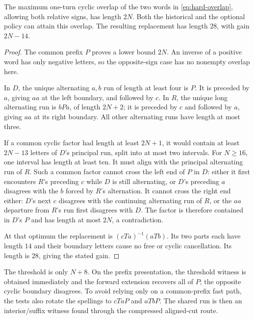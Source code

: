 \begin{proposition}
The maximum one-turn cyclic overlap of the two words in
\eqref{eq:hard-overlap}, allowing both relative signs, has length $2N$.
Both the historical and the optional policy can attain this overlap. The
resulting replacement has length $28$, with gain $2N-14$.
\label{prop:stress-overlap}
\end{proposition}
\begin{proof}
The common prefix $P$ proves a lower bound $2N$. An inverse of a positive
word has only negative letters, so the opposite-sign case has no nonempty
overlap here.

In $D$, the unique alternating $a,b$ run of length at least four is $P$.
It is preceded by $a$, giving $aa$ at the left boundary, and followed by
$c$. In $R$, the unique long alternating run is $bPa$, of length $2N+2$;
it is preceded by $c$ and followed by $a$, giving $aa$ at its right boundary.
All other alternating runs have length at most three.

If a common cyclic factor had length at least $2N+1$, it would contain at
least $2N-13$ letters of $D$'s principal run, split into at most two intervals.
For $N\geq16$, one interval has length at least ten. It must align with the
principal alternating run of $R$. Such a common factor cannot cross the
left end of $P$ in $D$: either it first encounters $R$'s preceding $c$ while
$D$ is still alternating, or $D$'s preceding $a$ disagrees with the $b$
forced by $R$'s alternation. It cannot cross the right end either: $D$'s
next $c$ disagrees with the continuing alternating run of $R$, or the $aa$
departure from $R$'s run first disagrees with $D$. The factor is therefore
contained in $D$'s $P$ and has length at most $2N$, a contradiction.

At that optimum the replacement is $(cTa)^{-1}(aTb)$. Its two parts each
have length $14$ and their boundary letters cause no free or cyclic
cancellation. Its length is $28$, giving the stated gain.
\end{proof}

The threshold is only $N+8$. On the prefix presentation, the threshold
witness is obtained immediately and the forward extension recovers all of
$P$; the opposite cyclic boundary disagrees. To avoid relying only on a
common-prefix fast path, the tests also rotate the spellings to $cTaP$ and
$aTbP$. The shared run is then an interior/suffix witness found through the
compressed aligned-cut route.

